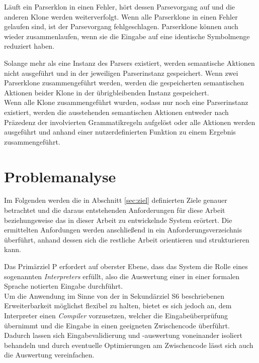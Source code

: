\documentclass[oneside]{ausarbeitung}
\begin{document}
Läuft ein Parserklon in einen Fehler, hört dessen Parsevorgang auf und die anderen Klone werden weiterverfolgt. Wenn alle Parserklone in einen Fehler gelaufen sind, ist der Parsevorgang fehlgeschlagen. Parserklone können auch wieder zusammenlaufen, wenn sie die Eingabe auf eine identische Symbolmenge reduziert haben.

Solange mehr als eine Instanz des Parsers existiert, werden semantische Aktionen nicht ausgeführt und in der jeweiligen Parserinstanz gespeichert. Wenn zwei Parserklone zusammengeführt werden, werden die gespeicherten semantischen Aktionen beider Klone in der übrigbleibenden Instanz gespeichert. \\
Wenn alle Klone zusammengeführt wurden, sodass nur noch eine Parserinstanz existiert, werden die ausstehenden semantischen Aktionen entweder nach Präzedenz der involvierten Grammatikregeln aufgelöst oder alle Aktionen werden ausgeführt und anhand einer nutzerdefinierten Funktion zu einem Ergebnis zusammengeführt.  \cite{GNU:BisonGLR}







\chapter{Problemanalyse}
\label{cha:problemanalyse}

Im Folgenden werden die in Abschnitt \ref{sec:ziel} definierten Ziele genauer betrachtet und die daraus entstehenden Anforderungen für diese Arbeit beziehungsweise das in dieser Arbeit zu entwickelnde System erörtert. Die ermittelten Anfordungen werden anschließend in ein Anforderungsverzeichnis überführt, anhand dessen sich die restliche Arbeit orientieren und strukturieren kann.
	
Das Primärziel P erfordert auf oberster Ebene, dass das System die Rolle eines sogenannten \textit{Interpreters} erfüllt, also die Auswertung einer in einer formalen Sprache notierten Eingabe durchführt. \\
Um die Anwendung im Sinne von der in Sekundärziel S6 beschriebenen Erweiterbarkeit möglichst flexibel zu halten, bietet es sich jedoch an, dem Interpreter einen \textit{Compiler} vorzusetzen, welcher die Eingabeüberprüfung übernimmt und die Eingabe in einen geeigneten Zwischencode überführt. \\
Dadurch lassen sich Eingabevalidierung und -auswertung voneinander isoliert behandeln und durch eventuelle Optimierungen am Zwischencode lässt sich auch die Auswertung vereinfachen.
	
\end{document}
